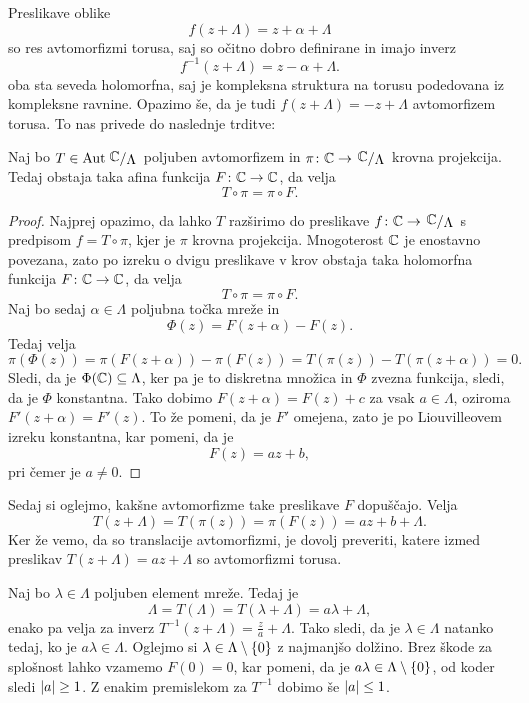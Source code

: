 

Preslikave oblike
\[
f(z + \Lambda) = z + \alpha + \Lambda
\]
so res avtomorfizmi torusa, saj so očitno dobro definirane in imajo
inverz
\[
f^{-1}(z + \Lambda) = z-\alpha + \Lambda.
\]
oba sta seveda holomorfna, saj je kompleksna struktura na torusu
podedovana iz kompleksne ravnine. Opazimo še, da je tudi
$f(z + \Lambda) = -z + \Lambda$ avtomorfizem torusa. To nas privede
do naslednje trditve:

\begin{trditev}
Naj bo $T \in \Aut \kvoc{\C}{\Lambda}$ poljuben avtomorfizem in
$\pi \colon \C \to \kvoc{\C}{\Lambda}$ krovna projekcija. Tedaj
obstaja taka afina funkcija $F \colon \mathbb{C} \to \mathbb{C}$, da velja
\[
T \circ \pi = \pi \circ F.
\]
\end{trditev}

\begin{proof}
Najprej opazimo, da lahko $T$ razširimo do preslikave
$f \colon \C \to \kvoc{\C}{\Lambda}$ s predpisom $f = T \circ \pi$,
kjer je $\pi$ krovna projekcija. Mnogoterost $\mathbb{C}$ je enostavno
povezana, zato po izreku o dvigu preslikave v krov obstaja taka
holomorfna funkcija $F \colon \mathbb{C} \to \mathbb{C}$, da velja
\[
T \circ \pi = \pi \circ F.
\]
Naj bo sedaj $\alpha \in \Lambda$ poljubna točka mreže in
\[
\Phi(z) = F(z + \alpha) - F(z).
\]
Tedaj velja
\[
\pi(\Phi(z)) =
\pi(F(z + \alpha)) - \pi(F(z)) =
T(\pi(z)) - T(\pi(z + \alpha)) =
0.
\]
Sledi, da je $\Phi(\mathbb{C}) \subseteq \Lambda$, ker pa je to diskretna
množica in $\Phi$ zvezna funkcija, sledi, da je $\Phi$ konstantna.
Tako dobimo $F(z + \alpha) = F(z) + c$ za vsak $a \in \Lambda$,
oziroma $F'(z + \alpha) = F'(z)$. To že pomeni, da je $F'$ omejena,
zato je po Liouvilleovem izreku konstantna, kar pomeni, da je
\[
F(z) = az + b,
\]
pri čemer je $a \ne 0$.
\end{proof}

Sedaj si oglejmo, kakšne avtomorfizme take preslikave $F$
dopuščajo. Velja
\[
T(z + \Lambda) = T(\pi(z)) = \pi(F(z)) = az + b + \Lambda.
\]
Ker že vemo, da so translacije avtomorfizmi, je dovolj preveriti,
katere izmed preslikav $T(z + \Lambda) = az + \Lambda$ so
avtomorfizmi torusa.

Naj bo $\lambda \in \Lambda$ poljuben element mreže. Tedaj je
\[
\Lambda = T(\Lambda) = T(\lambda + \Lambda) = a\lambda + \Lambda,
\]
enako pa velja za inverz
$T^{-1}(z + \Lambda) = \frac{z}{a} + \Lambda$. Tako sledi, da je
$\lambda \in \Lambda$ natanko tedaj, ko je $a \lambda \in \Lambda$.
Oglejmo si $\lambda \in \Lambda \setminus \left\{0\right\}$ z najmanjšo
dolžino. Brez škode za splošnost lahko vzamemo $F(0) = 0$, kar
pomeni, da je $a \lambda \in \Lambda \setminus \left\{0\right\}$, od koder
sledi $\left\lvert a\right\rvert \geq 1$. Z enakim premislekom za $T^{-1}$ dobimo še
$\left\lvert a\right\rvert \leq 1$.

